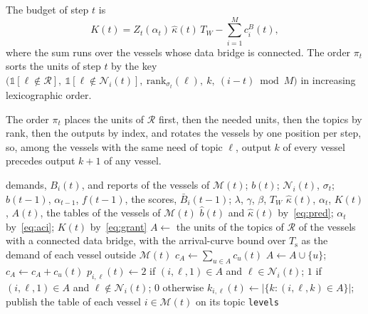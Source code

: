 \begin{definition}\label{def:grant}
The budget of step $t$ is
\begin{equation}
K(t) = Z_t(\alpha_t)\,\hat{\kappa}(t)\,T_W - \sum_{i=1}^{M} c^B_i(t),
\label{eq:grant}
\end{equation}
where the sum runs over the vessels whose data bridge is connected. The order $\pi_t$ sorts the units of step $t$ by the key $\big(\mathbb{1}[\ell \notin \mathcal{R}],\ \mathbb{1}[\ell \notin \mathcal{N}_i(t)],\ \mathrm{rank}_{\sigma_t}(\ell),\ k,\ (i - t) \bmod M\big)$ in increasing lexicographic order.
\end{definition}

The order $\pi_t$ places the units of $\mathcal{R}$ first, then the needed units, then the topics by rank, then the outputs by index, and rotates the vessels by one position per step, so, among the vessels with the same need of topic $\ell$, output $k$ of every vessel precedes output $k+1$ of any vessel.

\begin{algorithm}[t]
\caption{Admission control of phase~2 of step $t$}\label{alg:admission}
\begin{algorithmic}[1]
\Require demands, $B_i(t)$, and reports of the vessels of $\mathcal{M}(t)$; $b(t)$; $\mathcal{N}_i(t)$, $\sigma_t$; $\hat{b}(t-1)$, $\alpha_{t-1}$, $f(t-1)$, the scores, $\bar{B}_i(t-1)$; $\lambda$, $\gamma$, $\beta$, $T_W$
\Ensure $\hat{\kappa}(t)$, $\alpha_t$, $K(t)$, $A(t)$, the tables of the vessels of $\mathcal{M}(t)$
\State $\hat{b}(t)$ and $\hat{\kappa}(t)$ by~\eqref{eq:pred}; $\alpha_t$ by~\eqref{eq:aci}; $K(t)$ by~\eqref{eq:grant}
\State $A \gets$ the units of the topics of $\mathcal{R}$ of the vessels with a connected data bridge, with the arrival-curve bound over $T_{\mathrm{s}}$ as the demand of each vessel outside $\mathcal{M}(t)$
\State $c_A \gets \sum_{u \in A} c_u(t)$
  \label{alg:test}
    \State $A \gets A \cup \{u\}$; $c_A \gets c_A + c_u(t)$
  \EndIf
\EndFor
\State $p_{i,\ell}(t) \gets 2$ if $(i,\ell,1) \in A$ and $\ell \in \mathcal{N}_i(t)$; $1$ if $(i,\ell,1) \in A$ and $\ell \notin \mathcal{N}_i(t)$; $0$ otherwise
\State $k_{i,\ell}(t) \gets |\{k : (i, \ell, k) \in A\}|$; publish the table of each vessel $i \in \mathcal{M}(t)$ on its topic \texttt{levels}
\end{algorithmic}
\end{algorithm}

